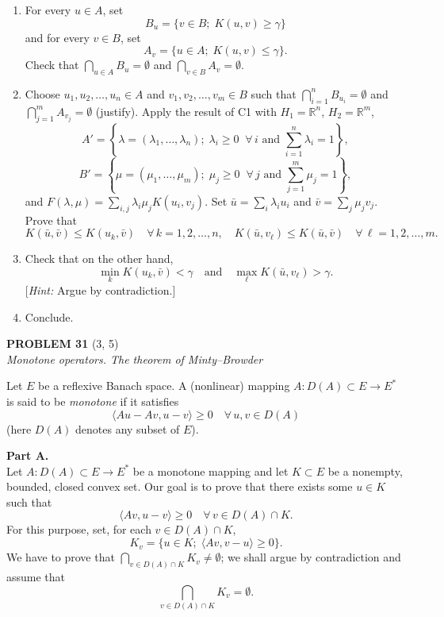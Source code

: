 \documentclass[12pt]{article}
\newcommand{\ip}[2]{\langle #1, #2 \rangle}
\newcommand{\R}{\mathbb{R}}
\begin{document}
\begin{enumerate}
\item For every $u \in A$, set
\[
B_u = \{v \in B;\; K(u,v) \ge \gamma\}
\]
and for every $v \in B$, set
\[
A_v = \{u \in A;\; K(u,v) \le \gamma\}.
\]
Check that $\bigcap_{u \in A} B_u = \emptyset$ and $\bigcap_{v \in B} A_v = \emptyset$.
 
\item Choose $u_1, u_2, \ldots, u_n \in A$ and $v_1, v_2, \ldots, v_m \in B$ such that
$\bigcap_{i=1}^n B_{u_i} = \emptyset$ and $\bigcap_{j=1}^m A_{v_j} = \emptyset$ (justify). Apply the result of C1
with $H_1 = \R^n$, $H_2 = \R^m$,
\[
A' = \left\{\lambda = (\lambda_1, \ldots, \lambda_n);\; \lambda_i \ge 0\;\;\forall\, i \text{ and } \sum_{i=1}^n \lambda_i = 1\right\},
\]
\[
B' = \left\{\mu = (\mu_1, \ldots, \mu_m);\; \mu_j \ge 0\;\;\forall\, j \text{ and } \sum_{j=1}^m \mu_j = 1\right\},
\]
and $F(\lambda,\mu) = \sum_{i,j}\lambda_i\mu_j K(u_i, v_j)$. Set $\bar{u} = \sum_i \lambda_i u_i$ and
$\bar{v} = \sum_j \mu_j v_j$. Prove that
\[
K(\bar{u}, \bar{v}) \le K(u_k, \bar{v}) \quad \forall\, k = 1, 2, \ldots, n,\quad
K(\bar{u}, v_\ell) \le K(\bar{u}, \bar{v}) \quad \forall\, \ell = 1, 2, \ldots, m.
\]
 
\item Check that on the other hand,
\[
\min_k K(u_k, \bar{v}) < \gamma \quad \text{and} \quad \max_\ell K(\bar{u}, v_\ell) > \gamma.
\]
[\textit{Hint:} Argue by contradiction.]
 
\item Conclude.
\end{enumerate}
 
\bigskip
 
\noindent\textbf{PROBLEM 31} (3, 5)\\[4pt]
\textit{Monotone operators. The theorem of Minty--Browder}
 
\medskip
 
Let $E$ be a reflexive Banach space. A (nonlinear) mapping $A : D(A) \subset E \to E^*$
is said to be \emph{monotone} if it satisfies
\[
\ip{Au - Av}{u - v} \ge 0 \quad \forall\, u, v \in D(A)
\]
(here $D(A)$ denotes any subset of $E$).
 
\medskip
 
\noindent\textbf{Part A.}\\
Let $A : D(A) \subset E \to E^*$ be a monotone mapping and let $K \subset E$ be a nonempty,
bounded, closed convex set. Our goal is to prove that there exists some $u \in K$ such that
\[
\ip{Av}{u - v} \ge 0 \quad \forall\, v \in D(A) \cap K.
\]
For this purpose, set, for each $v \in D(A) \cap K$,
\[
K_v = \{u \in K;\; \ip{Av}{v - u} \ge 0\}.
\]
We have to prove that $\bigcap_{v \in D(A) \cap K} K_v \neq \emptyset$; we shall argue by contradiction
and assume that
\[
\bigcap_{v \in D(A) \cap K} K_v = \emptyset.
\]
 
\end{document}
